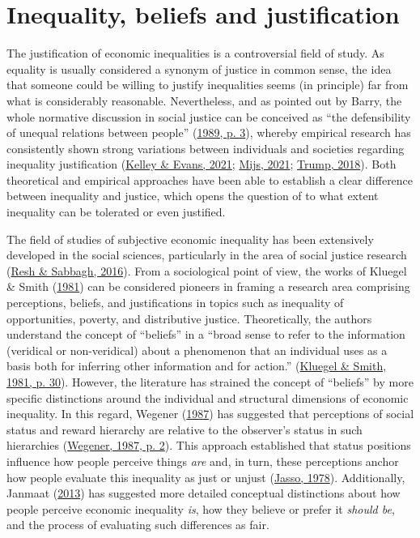 \documentclass[
  12pt,
  a4paper,
]{article}
\begin{document}
\hypertarget{inequality-beliefs-and-justification}{%
\section{Inequality, beliefs and
justification}\label{inequality-beliefs-and-justification}}

The justification of economic inequalities is a controversial field of
study. As equality is usually considered a synonym of justice in common
sense, the idea that someone could be willing to justify inequalities
seems (in principle) far from what is considerably reasonable.
Nevertheless, and as pointed out by Barry, the whole normative
discussion in social justice can be conceived as ``the defensibility of
unequal relations between people''
(\protect\hyperlink{ref-barry_theories_1989}{1989, p. 3}), whereby
empirical research has consistently shown strong variations between
individuals and societies regarding inequality justification
(\protect\hyperlink{ref-kelley_legitimate_2021}{Kelley \& Evans, 2021};
\protect\hyperlink{ref-mijs_paradox_2021}{Mijs, 2021};
\protect\hyperlink{ref-trump_income_2018}{Trump, 2018}). Both
theoretical and empirical approaches have been able to establish a clear
difference between inequality and justice, which opens the question of
to what extent inequality can be tolerated or even justified.

The field of studies of subjective economic inequality has been
extensively developed in the social sciences, particularly in the area
of social justice research (\protect\hyperlink{ref-Resh2016}{Resh \&
Sabbagh, 2016}). From a sociological point of view, the works of Kluegel
\& Smith
(\protect\hyperlink{ref-kluegelBeliefsStratification1981}{1981}) can be
considered pioneers in framing a research area comprising perceptions,
beliefs, and justifications in topics such as inequality of
opportunities, poverty, and distributive justice. Theoretically, the
authors understand the concept of ``beliefs'' in a ``broad sense to
refer to the information (veridical or non-veridical) about a phenomenon
that an individual uses as a basis both for inferring other information
and for action.''
(\protect\hyperlink{ref-kluegelBeliefsStratification1981}{Kluegel \&
Smith, 1981, p. 30}). However, the literature has strained the concept
of ``beliefs'' by more specific distinctions around the individual and
structural dimensions of economic inequality. In this regard, Wegener
(\protect\hyperlink{ref-wegenerIllusionDistributiveJustice1987}{1987})
has suggested that perceptions of social status and reward hierarchy are
relative to the observer's status in such hierarchies
(\protect\hyperlink{ref-wegenerIllusionDistributiveJustice1987}{Wegener,
1987, p. 2}). This approach established that status positions influence
how people perceive things \emph{are} and, in turn, these perceptions
anchor how people evaluate this inequality as just or unjust
(\protect\hyperlink{ref-jassoJusticeEarningsNew1978}{Jasso, 1978}).
Additionally, Janmaat
(\protect\hyperlink{ref-janmaatSubjectiveInequalityReview2013}{2013})
has suggested more detailed conceptual distinctions about how people
perceive economic inequality \emph{is}, how they believe or prefer it
\emph{should be}, and the process of evaluating such differences as
fair.
\end{document}
